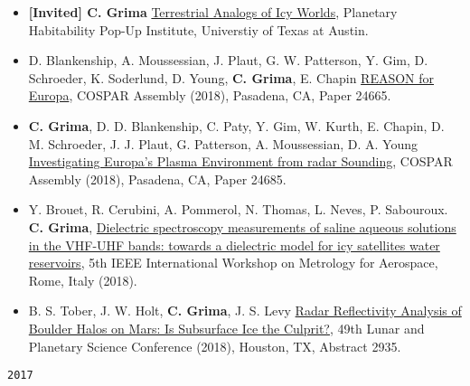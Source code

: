\begin{itemize}
\item
  \textbf{{[}Invited{]} C. Grima}
  \href{https://ig.utexas.edu/events/planetary-habitability/program-and-registration/week-3-habitability/}{Terrestrial
  Analogs of Icy Worlds}, Planetary Habitability Pop-Up Institute,
  Universtiy of Texas at Austin.
\item
  D. Blankenship, A. Moussessian, J. Plaut, G. W. Patterson, Y. Gim, D.
  Schroeder, K. Soderlund, D. Young, \textbf{C. Grima}, E. Chapin
  \href{}{REASON for Europa}, COSPAR Assembly (2018), Pasadena, CA,
  Paper 24665.
\item
  \textbf{C. Grima}, D. D. Blankenship, C. Paty, Y. Gim, W. Kurth, E.
  Chapin, D. M. Schroeder, J. J. Plaut, G. Patterson, A. Moussessian, D.
  A. Young \href{}{Investigating Europa's Plasma Environment from radar
  Sounding}, COSPAR Assembly (2018), Pasadena, CA, Paper 24685.
\item
  Y. Brouet, R. Cerubini, A. Pommerol, N. Thomas, L. Neves, P.
  Sabouroux. \textbf{C. Grima},
  \href{http://www.metroaerospace.org/files/MAS2018_Final.pdf}{Dielectric
  spectroscopy measurements of saline aqueous solutions in the VHF-UHF
  bands: towards a dielectric model for icy satellites water
  reservoirs}, 5th IEEE International Workshop on Metrology for
  Aerospace, Rome, Italy (2018).
\item
  B. S. Tober, J. W. Holt, \textbf{C. Grima}, J. S. Levy
  \href{https://www.hou.usra.edu/meetings/lpsc2018/pdf/2935.pdf}{Radar
  Reflectivity Analysis of Boulder Halos on Mars: Is Subsurface Ice the
  Culprit?}, 49th Lunar and Planetary Science Conference (2018),
  Houston, TX, Abstract 2935.
\end{itemize}

\noindent\texttt{2017}

